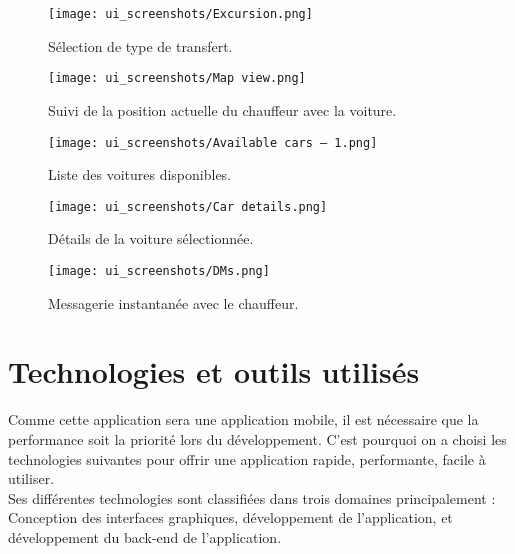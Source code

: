\clearpage
\begin{multicols}{2}
    \begin{figure}[H]
        \centering
        \texttt{[image: ui\_screenshots/Excursion.png]}
        \vspace{1cm}
        \captionsetup{justification=centering}

        \caption{\centering Sélection de type de transfert.}
        \label{fig:trip_select}
    \end{figure}
    \begin{figure}[H]
        \centering
        \texttt{[image: ui\_screenshots/Map view.png]}
        \vspace{1cm}
        \captionsetup{justification=centering}

        \caption{\centering Suivi de la position actuelle du chauffeur avec la voiture.}
        \label{fig:follow_driver}
    \end{figure}
\end{multicols}
\begin{multicols}{2}
    \begin{figure}[H]
        \centering
        \texttt{[image: ui\_screenshots/Available cars – 1.png]}
        \vspace{1cm}
        \captionsetup{justification=centering}

        \caption{\centering Liste des voitures disponibles.}
        \label{fig:available_cars}
    \end{figure}
    \begin{figure}[H]
        \centering
        \texttt{[image: ui\_screenshots/Car details.png]}
        \vspace{1cm}
        \captionsetup{justification=centering}

        \caption{\centering Détails de la voiture sélectionnée.}
        \label{fig:car_details}
    \end{figure}
\end{multicols}
\vspace{1cm}
\begin{figure}[H]
    \centering
    \texttt{[image: ui\_screenshots/DMs.png]}
    \vspace{1cm}
    \caption{\centering Messagerie instantanée avec le chauffeur.}
    \label{fig:dms}
\end{figure}
\section{Technologies et outils utilisés}
Comme cette application sera une application mobile, il est nécessaire que la performance soit la priorité lors du développement. C'est pourquoi on a choisi les technologies suivantes pour offrir une application rapide, performante, facile à utiliser.\\
\noindent Ses différentes technologies sont classifiées dans trois domaines principalement : Conception des interfaces graphiques, développement de l'application, et développement du back-end de l'application.\\
